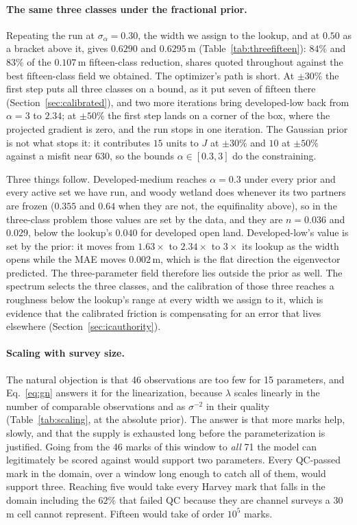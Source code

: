 \documentclass[11pt]{article}
\begin{document}
\paragraph{The same three classes under the fractional prior.}
Repeating the run at $\sigma_\alpha = 0.30$, the width we assign to
the lookup, and at $0.50$ as a bracket above it, gives $0.6290$ and
$0.6295$\,m (Table~\ref{tab:threefifteen}): $84\%$ and $83\%$ of the
$0.107$\,m fifteen-class reduction, shares quoted throughout against
the best fifteen-class field we obtained. The optimizer's path is short. At
$\pm 30\%$ the first step puts all three classes on a bound, as it
put seven of fifteen there (Section~\ref{sec:calibrated}), and two
more iterations bring developed-low back from $\alpha = 3$ to $2.34$;
at $\pm 50\%$ the first step lands on a corner of the box, where the
projected gradient is zero, and the run stops in one iteration. The
Gaussian prior is not what stops it: it contributes $15$ units to $J$
at $\pm 30\%$ and $10$ at $\pm 50\%$ against a misfit near $630$, so
the bounds $\alpha \in [0.3, 3]$ do the constraining.

Three things follow. Developed-medium reaches $\alpha = 0.3$ under
every prior and every active set we have run, and woody wetland does
whenever its two partners are frozen ($0.355$ and $0.64$ when they are
not, the equifinality above), so in the three-class problem those
values are set by the data, and they are $n = 0.036$ and $0.029$,
below the lookup's $0.040$ for developed open land. Developed-low's
value is set by the prior: it moves from $1.63\times$ to $2.34\times$
to $3\times$ its lookup as the width opens while the MAE moves
$0.002$\,m, which is the flat direction the eigenvector predicted. The
three-parameter field therefore lies outside the prior as well. The
spectrum selects the three classes, and the calibration of those
three reaches a roughness below the lookup's range at every width we
assign to it, which is evidence that the calibrated friction is
compensating for an error that lives elsewhere
(Section~\ref{sec:icauthority}).


\paragraph{Scaling with survey size.}
The natural objection is that 46 observations are too few for 15
parameters, and Eq.~\eqref{eq:gn} answers it for the
linearization, because $\lambda$ scales linearly in the number of
comparable observations and as $\sigma^{-2}$ in their quality
(Table~\ref{tab:scaling}, at the absolute prior). The answer is that
more marks help, slowly, and that the supply is exhausted long before
the parameterization is justified. Going from the 46 marks of this
window to \emph{all} 71 the model can legitimately be scored against
would support two parameters. Every QC-passed mark in the domain,
over a window long enough to catch all of them, would support three.
Reaching five would take every Harvey mark that falls in the domain
including the $62\%$ that failed QC because they are channel surveys
a 30\,m cell cannot represent. Fifteen would take of order $10^5$
marks.
\end{document}

